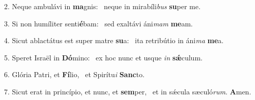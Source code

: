 2. Neque ambulávi in \textbf{ma}gnis: \ast\  neque in mirabíli\textit{bus} \textbf{su}per me.\

3. Si non humíliter senti\textbf{é}bam: \ast\  sed exaltávi áni\textit{mam} \textbf{me}am.\

4. Sicut ablactátus est super matre \textbf{su}a: \ast\  ita retribútio in áni\textit{ma} \textbf{me}a.\

5. Speret Israël in \textbf{Dó}mino: \ast\  ex hoc nunc et usque \textit{in} \textbf{sǽ}culum.\

6. Glória Patri, et \textbf{Fí}lio, \ast\  et Spirítu\textit{i} \textbf{Sanc}to.\

7. Sicut erat in princípio, et nunc, et \textbf{sem}per, \ast\  et in sǽcula sæculó\textit{rum}. \textbf{A}men.\


